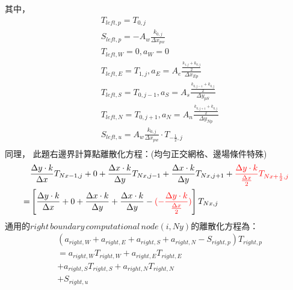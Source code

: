 \documentclass[12pt]{article}
\begin{document}
\noindent 其中，
\begin{equation}
    \begin{split}
        &T_{left,p} = T_{0,j} \\
        &S_{left,p} = -A_{w}\frac{k_{0,j}}{\Delta x_{pw}}\\
        &T_{left,W} = 0 , a_{W} = 0\\
        &T_{left,E} = T_{1,j}, a_{E} = A_{e}\frac{\frac{k_{1,j}+k_{0,j}}{2}}{\Delta x_{Ep}}\\
        &T_{left,S} = T_{0,j-1}, a_{S} = A_{s}\frac{\frac{k_{0,j-1}+k_{0,j}}{2}}{\Delta y_{pS}}\\
        &T_{left,N} = T_{0,j+1} ,a_{N} = A_{n}\frac{\frac{k_{0,j+1}+k_{0,j}}{2}}{\Delta y_{Np}}\\
        &S_{left,u} =A_{w}\frac{k_{0,j}}{\Delta x_{pw}}\cdot T_{-\frac{1}{2},j}\\
    \end{split}
\end{equation}
\noindent 同理，
\noindent 此題右邊界計算點離散化方程：(均勻正交網格、邊場條件特殊)\\
\begin{equation}
    \begin{split}
 &\frac{\Delta y   \cdot k}{\Delta x}T_{Nx-1,j}+0+
 \frac{\Delta x   \cdot k }{\Delta y}T_{Nx,j-1}+ \frac{\Delta x   \cdot k }{\Delta y}T_{Nx,j+1} + {\color{red}\frac{\Delta y\cdot k }{\frac{\Delta x}{2}}T_{Nx+\frac{1}{2},j}}\\
=&\left[\frac{\Delta y   \cdot k }{\Delta x}+ 0 + \frac{\Delta x \cdot k }{\Delta y} +\frac{\Delta x   \cdot k }{\Delta y}- {\color{red}(-\frac{\Delta y\cdot k }{\frac{\Delta x}{2}})} \right]T_{Nx,j} \\
\end{split}
\end{equation}
\noindent 通用的$right\,boundary\,computational\,node (i,Ny)$的離散化方程為：\\
\begin{equation}
\begin{split}
    &(a_{right,W}+a_{right,E}+a_{right,S}+a_{right,N}-S_{right,p})T_{right,p}\\
    &= a_{right,W}T_{right,W} + a_{right,E}T_{right,E} \\
    & +  a_{right,S}T_{right,S} + a_{right,N}T_{right,N}\\
    &+ S_{right,u}\\
\end{split}
\end{equation}
\end{document}
